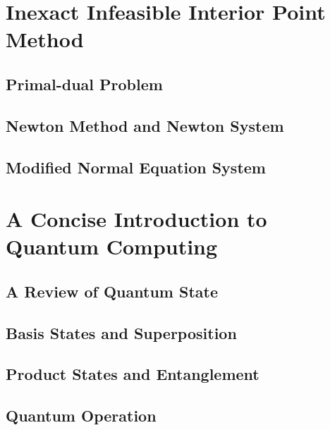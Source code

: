 \documentclass[
	11pt, %
	a4paper, %
]{LegrandOrangeBook}
\begin{document}
\chapter{Inexact Infeasible Interior Point Method}

    \section{Primal-dual Problem}
    

    \section{Newton Method and Newton System}
    

    \section{Modified Normal Equation System}
    

\chapter{A Concise Introduction to Quantum Computing}

    \section{A Review of Quantum State}
    

    \section{Basis States and Superposition}
    

    \section{Product States and Entanglement}
    

    \section{Quantum Operation}
    
\end{document}
